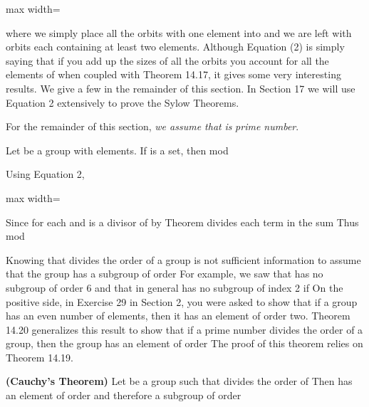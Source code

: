 \documentclass[11pt,oneside]{article}
\begin{document}
\begin{BookBody}
\begin{center}\begin{adjustbox}{max width=\linewidth}\end{adjustbox}\end{center}

\noindent where we simply place all the orbits with one element into  and we are left with  orbits each containing at least two elements. Although Equation (2) is simply saying that if you add up the sizes of all the orbits you account for all the elements of  when coupled with Theorem 14.17, it gives some very interesting results. We give a few in the remainder of this section. In Section 17 we will use Equation 2 extensively to prove the Sylow Theorems.

For the remainder of this section,\textit{ we assume that}  \textit{is}  \textit{prime number}.

 Let  be a group with  elements. If  is a set, then  mod 

 Using Equation 2,

\begin{center}\begin{adjustbox}{max width=\linewidth}\end{adjustbox}\end{center}

\noindent Since for each  and  is a divisor of  by Theorem  divides each term in the sum  Thus  mod \BookEnd{\blacklozenge}

\noindent Knowing that  divides the order of a group is not sufficient information to assume that the group has a subgroup of order  For example, we saw that  has no subgroup of order 6 and that in general has no subgroup of index 2 if  On the positive side, in Exercise 29 in Section 2, you were asked to show that if a group has an even number of elements, then it has an element of order two. Theorem 14.20 generalizes this result to show that if a prime number  divides the order of a group, then the group has an element of order  The proof of this theorem relies on Theorem 14.19.

 \textbf{(Cauchy’s Theorem)} Let  be a group such that  divides the order of  Then  has an element of order  and therefore a subgroup of order 

\end{BookBody}
\end{document}
